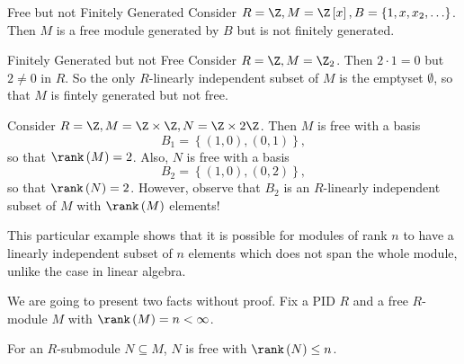 \documentclass[pmath441]{subfiles}
\begin{document}
    \rruleline

    \begin{example}{Free but not Finitely Generated}
        Consider $R=\Z,M=\Z\left[ x \right],B=\left\lbrace 1,x,x_2,\ldots \right\rbrace$. Then $M$ is a free module generated by $B$ but is not finitely generated.
    \end{example}

    \rruleline
    
    \begin{example}{Finitely Generated but not Free}
        Consider $R=\Z, M=\Z_2$. Then $2\cdot 1 =0$ but $2\neq 0$ in $R$. So the only $R$-linearly independent subset of $M$ is the emptyset $\emptyset$, so that $M$ is fintely generated but not free.
    \end{example}

    \rruleline
    
    \begin{example}{}
        Consider $R=\Z, M=\Z\times\Z, N=\Z\times 2\Z$. Then $M$ is free with a basis
        \begin{equation*}
            B_1 = \left\lbrace \left( 1,0 \right),\left( 0,1 \right) \right\rbrace,
        \end{equation*}
        so that $\rank\left( M \right) = 2$. Also, $N$ is free with a basis
        \begin{equation*}
            B_2 = \left\lbrace \left( 1,0 \right),\left( 0,2 \right) \right\rbrace,
        \end{equation*}
        so that $\rank\left( N \right) = 2$. However, observe that $B_2$ is an $R$-linearly independent subset of $M$ with $\rank\left( M \right)$ elements!

        This particular example shows that it is possible for modules of rank $n$ to have a linearly independent subset of $n$ elements which does not span the whole module, unlike the case in linear algebra.
    \end{example}

    \rruleline

    \clearpage
    
    \np We are going to present two facts without proof. Fix a PID $R$ and a free $R$-module $M$ with $\rank\left( M \right) = n<\infty$.

    \begin{fact}{}
        For an $R$-submodule $N\subseteq M$, $N$ is free with $\rank\left( N \right)\leq n$.
    \end{fact}
\end{document}

